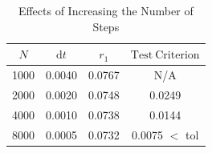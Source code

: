 \documentclass{article}
\newcommand{\cw}{\color{white}}
\begin{document}
\begin{table}[h]
  \centering
  \caption{\cw Effects of Increasing the Number of Steps}
  \begin{tabular}{cccc} \toprule
      {$N$} & {$\mathrm{d}t$} & {$r_1$} & {$\mathrm{Test \ Criterion}$} \\ \midrule
      1000  & 0.0040 & 0.0767 & N/A    \\
      2000  & 0.0020 & 0.0748 & 0.0249 \\
      4000  & 0.0010 & 0.0738 & 0.0144 \\
      8000  & 0.0005 & 0.0732 & \color{magenta} 0.0075 \cw $<$ tol \\ \bottomrule
  \end{tabular}
  \label{tab:table2}
\end{table}
\end{document}
